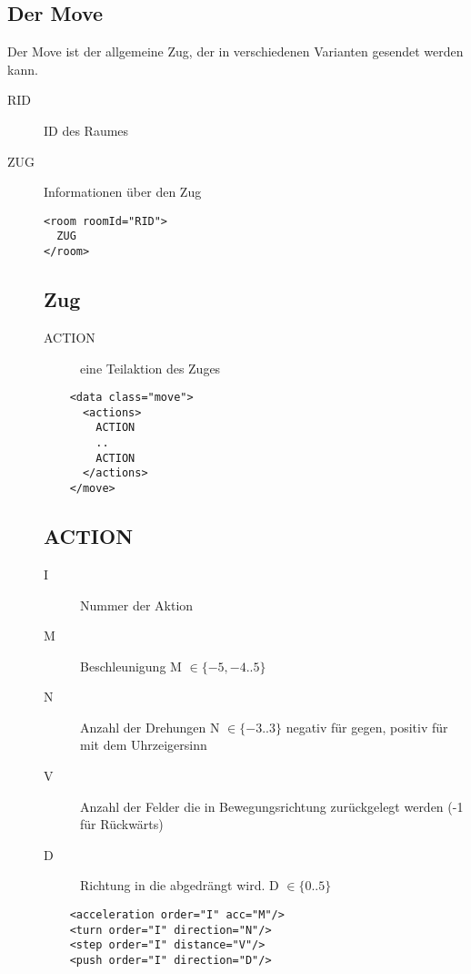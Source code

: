 \documentclass[12pt,a4paper, ngerman, oneside]{scrartcl}
\begin{document}
\subsection{\label{Move}Der Move}
Der Move ist der allgemeine Zug, der in verschiedenen Varianten gesendet werden kann.
\begin{description}
\item[RID] ID des Raumes
\item[ZUG] Informationen über den Zug
\begin{verbatim}
<room roomId="RID">
  ZUG
</room>

\end{verbatim}
\subsection{Zug}
\label{move}
\begin{description}
\item[ACTION] eine Teilaktion des Zuges
\end{description}
\begin{verbatim}
	<data class="move">
	  <actions>
	    ACTION
	    ..
	    ACTION
	  </actions>
	</move>
\end{verbatim}

\subsection{ACTION}
\label{action}
\begin{description}
\item[I] Nummer der Aktion
\item[M] Beschleunigung M $\in \{-5,-4..5\}$
\item[N] Anzahl der Drehungen N $\in \{-3..3\}$ negativ für gegen, positiv für mit dem Uhrzeigersinn
\item[V] Anzahl der Felder die in Bewegungsrichtung zurückgelegt werden (-1 für Rückwärts)
\item[D] Richtung in die abgedrängt wird. D $\in \{0..5\}$
\end{description}
\begin{verbatim}
	<acceleration order="I" acc="M"/>
	<turn order="I" direction="N"/>
	<step order="I" distance="V"/>  
	<push order="I" direction="D"/>
\end{verbatim}
\end{description}
\end{document}
